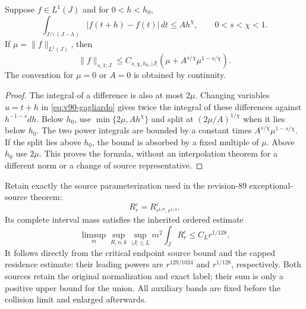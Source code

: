 \begin{lemma}
\label{lem:v90-interpolation}
Suppose $f\in L^1(J)$ and for $0<h<h_0$,
\[
 \int_{J\cap(J-h)}|f(t+h)-f(t)|\,dt\le A h^\chi,
          \qquad 0<s<\chi<1.
\]
If $\mu=\|f\|_{L^1(J)}$, then
\begin{equation}\label{eq:v90-interpolation}
 \|f\|_{s,1;J}\le C_{s,\chi,h_0,|J|}
                 \left(\mu+A^{s/\chi}\mu^{1-s/\chi}\right).
\end{equation}
The convention for $\mu=0$ or $A=0$ is obtained by continuity.
\end{lemma}
\begin{proof}
The integral of a difference is also at most $2\mu$. Changing
variables $u=t+h$ in \eqref{eq:v90-gagliardo} gives twice the
integral of these differences against $h^{-1-s}dh$. Below $h_0$,
use $\min\{2\mu,Ah^\chi\}$ and split at
$(2\mu/A)^{1/\chi}$ when it lies below $h_0$. The two power
integrals are bounded by a constant times
$A^{s/\chi}\mu^{1-s/\chi}$. If the split lies above $h_0$, the
bound is absorbed by a fixed multiple of $\mu$. Above $h_0$ use
$2\mu$. This proves the formula, without an interpolation theorem
for a different norm or a change of source representative.
\end{proof}

Retain exactly the source parameterization used in the revision-89
exceptional-source theorem:
\begin{equation}\label{eq:v90-cofinal-source}
 R_r^\varepsilon=R_{r^{1/8},r^{1/4}}^\varepsilon.
\end{equation}
Its complete interval mass satisfies the inherited ordered estimate
\begin{equation}\label{eq:v90-union-mass-input}
 \limsup_m\sup_{R,n,k}\sup_{|J|\le L}
              m^2\int_JR_r^\varepsilon\le C_L r^{1/128}.
\end{equation}
It follows directly from the critical endpoint source bound and the
capped residence estimate: their leading powers are $r^{129/1024}$
and $r^{1/128}$, respectively. Both sources retain the original
normalization and exact label; their sum is only a positive upper
bound for the union. All auxiliary bands are fixed before the
collision limit and enlarged afterwards.

